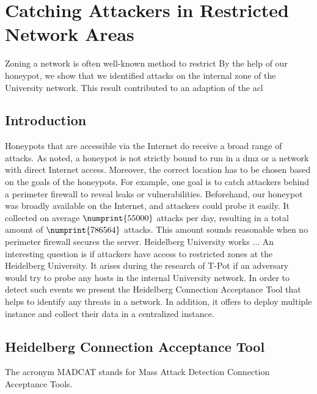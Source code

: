 \chapter{Catching Attackers in Restricted Network Areas}
\label{chap:concept}

Zoning a network is often well-known method to restrict 
By the help of our honeypot, we show that we identified attacks on the internal zone of the University network.
This result contributed to an adaption of the \ac{acl}

\section{Introduction}

Honeypots that are accessible via the Internet do receive a broad range of attacks.
As \citet{Spitzner2003} noted, a honeypot is not strictly bound to run in a \ac{dmz} or a network with direct Internet access.
Moreover, the correct location has to be chosen based on the goals of the honeypots.
For example, one goal is to catch attackers behind a perimeter firewall to reveal leaks or vulnerabilities.
Beforehand, our honeypot was broadly available on the Internet, and attackers could probe it easily.
It collected on average $\numprint{55000}$ attacks per day, resulting in a total amount of $\numprint{786564}$ attacks.
This amount sounds reasonable when no perimeter firewall secures the server.
Heidelberg University works ...%
An interesting question is if attackers have access to restricted zones at the Heidelberg University.
It arises during the research of T-Pot if an adversary would try to probe any hosts in the internal University network.
In order to detect such events we present the Heidelberg Connection Acceptance Tool that helps to identify any threats in a network.
In addition, it offers to deploy multiple instance and collect their data in a centralized instance. 

\section{Heidelberg Connection Acceptance Tool}

The acronym MADCAT stands for Mass Attack Detection Connection Acceptance Tools.

